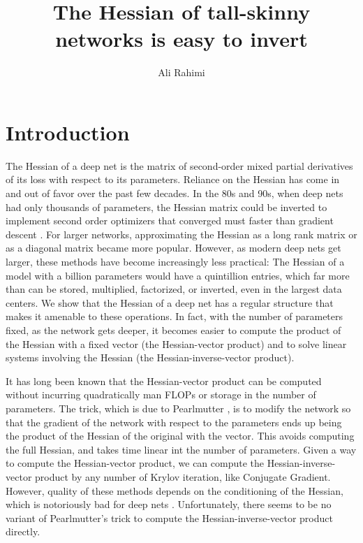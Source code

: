 \documentclass{article}
\title{The Hessian of tall-skinny networks is easy to invert}
\author{Ali Rahimi}
\begin{document}
\maketitle

\section{Introduction}

The Hessian of a deep net is the matrix of second-order mixed partial
derivatives of its loss with respect to its parameters. Reliance on the Hessian
has come in and out of favor over the past few decades. In the 80s and 90s,
when deep nets had only thousands of parameters, the Hessian matrix could be
inverted to implement second order optimizers that converged must faster than
gradient descent \cite{Watrous1987, Barnard1992}. For larger networks,
approximating the Hessian as a long rank matrix \cite{Webb1988, lbfgs-deep-net}
or as a diagonal matrix \cite{becker-lecun-89, adagrad} became more popular.
However, as modern deep nets get larger, these methods have become increasingly
less practical: The Hessian of a model with a billion parameters would have a
quintillion entries, which far more than can be stored, multiplied, factorized,
or inverted, even in the largest data centers. We show that the Hessian of a
deep net has a regular structure that makes it amenable to these operations. In
fact, with the number of parameters fixed, as the network gets deeper, it
becomes easier to compute the product of the Hessian with a fixed vector (the
Hessian-vector product) and to solve linear systems involving the Hessian (the
Hessian-inverse-vector product).

It has long been known that the Hessian-vector product can be computed without
incurring quadratically man FLOPs or storage in the number of parameters. The
trick, which is due to Pearlmutter \cite{pearlmutter-94}, is to modify the
network so that the gradient of the network with respect to the parameters ends
up being the product of the Hessian of the original with the vector. This
avoids computing the full Hessian, and takes time linear int the number of
parameters. Given a way to compute the Hessian-vector product, we can compute
the Hessian-inverse-vector product by any number of Krylov iteration, like
Conjugate Gradient. However, quality of these methods depends on the
conditioning of the Hessian, which is notoriously bad for deep nets
\cite{ying-behrooz-hessian-spectrum}. Unfortunately, there seems to be no
variant of Pearlmutter's trick to compute the Hessian-inverse-vector product
directly.
\end{document}

